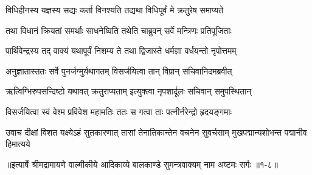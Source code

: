 \twolineshloka
{विधिहीनस्य यज्ञस्य सद्यः कर्ता विनश्यति}
{तद्यथा विधिपूर्वं मे क्रतुरेष समाप्यते} %

\twolineshloka
{तथा विधानं क्रियतां समर्थाः साधनेष्विति}
{तथेति चाब्रुवन् सर्वे मन्त्रिणः प्रतिपूजिताः} %

\twolineshloka
{पार्थिवेन्द्रस्य तद् वाक्यं यथापूर्वं निशम्य ते}
{तथा द्विजास्ते धर्मज्ञा वर्धयन्तो नृपोत्तमम्} %

\twolineshloka
{अनुज्ञातास्ततः सर्वे पुनर्जग्मुर्यथागतम्}
{विसर्जयित्वा तान् विप्रान् सचिवानिदमब्रवीत्} %

\twolineshloka
{ऋत्विग्भिरुपसन्दिष्टो यथावत् क्रतुराप्यताम्}
{इत्युक्त्वा नृपशार्दूलः सचिवान् समुपस्थितान्} %

\twolineshloka
{विसर्जयित्वा स्वं वेश्म प्रविवेश महामतिः}
{ततः स गत्वा ताः पत्नीर्नरेन्द्रो हृदयङ्गमाः} %

\threelineshloka
{उवाच दीक्षां विशत यक्ष्येऽहं सुतकारणात्}
{तासां तेनातिकान्तेन वचनेन सुवर्चसाम्}
{मुखपद्मान्यशोभन्त पद्मानीव हिमात्यये} %


॥इत्यार्षे श्रीमद्रामायणे वाल्मीकीये आदिकाव्ये बालकाण्डे सुमन्त्रवाक्यम् नाम अष्टमः सर्गः ॥१-८॥
